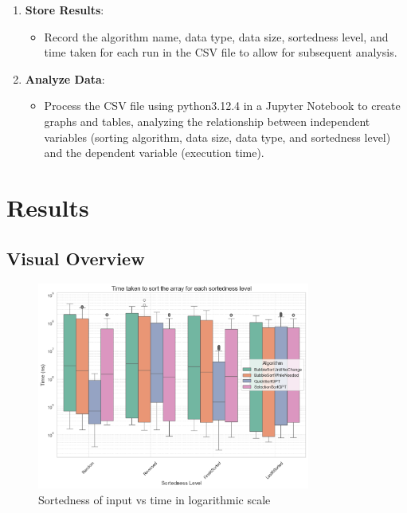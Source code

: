 \documentclass[unicode,11pt,a4paper,oneside,numbers=endperiod,openany]{scrartcl}
\begin{document}
\begin{enumerate}
        \item \textbf{Store Results}:
        \begin{itemize}
            \item Record the algorithm name, data type, data size, sortedness level, and time taken for each run in the CSV file to allow for subsequent analysis.
        \end{itemize}
    
        \item \textbf{Analyze Data}:
        \begin{itemize}
            \item Process the CSV file using python3.12.4 in a Jupyter Notebook to create graphs and tables, analyzing the relationship between independent variables (sorting algorithm, data size, data type, and sortedness level) and the dependent variable (execution time).
        \end{itemize}
    \end{enumerate}


\section{Results}

    \subsection{Visual Overview}


    \begin{figure}[htbp]
        \centering
        \includegraphics[width=0.8\textwidth]{./fig/hip1.png}
        \caption{Sortedness of input vs time in logarithmic scale}
        \label{fig:hip1}
    \end{figure}
\end{document}
